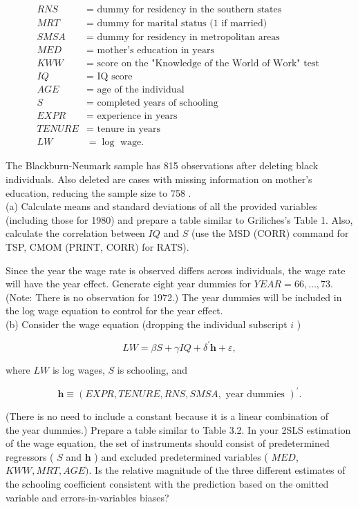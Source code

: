 \documentclass[10pt]{article}
\begin{document}
$$
\begin{aligned}
R N S & =\text { dummy for residency in the southern states } \\
M R T & =\text { dummy for marital status (1 if married) } \\
S M S A & =\text { dummy for residency in metropolitan areas } \\
M E D & =\text { mother's education in years } \\
K W W & =\text { score on the "Knowledge of the World of Work" test } \\
I Q & =\text { IQ score } \\
A G E & =\text { age of the individual } \\
S & =\text { completed years of schooling } \\
E X P R & =\text { experience in years } \\
T E N U R E & =\text { tenure in years } \\
L W & =\log \text { wage. }
\end{aligned}
$$

The Blackburn-Neumark sample has 815 observations after deleting black individuals. Also deleted are cases with missing information on mother's education, reducing the sample size to 758 .\\
(a) Calculate means and standard deviations of all the provided variables (including those for 1980) and prepare a table similar to Griliches's Table 1. Also, calculate the correlation between $I Q$ and $S$ (use the MSD (CORR) command for TSP, CMOM (PRINT, CORR) for RATS).

Since the year the wage rate is observed differs across individuals, the wage rate will have the year effect. Generate eight year dummies for $Y E A R=66, \ldots, 73$. (Note: There is no observation for 1972.) The year dummies will be included in the log wage equation to control for the year effect.\\
(b) Consider the wage equation (dropping the individual subscript $i$ )

$$
L W=\beta S+\gamma I Q+\delta^{\prime} \mathbf{h}+\varepsilon,
$$

where $L W$ is log wages, $S$ is schooling, and

$$
\mathbf{h} \equiv(E X P R, T E N U R E, R N S, S M S A, \text { year dummies })^{\prime} .
$$

(There is no need to include a constant because it is a linear combination of\\
the year dummies.) Prepare a table similar to Table 3.2. In your 2SLS estimation of the wage equation, the set of instruments should consist of predetermined regressors ( $S$ and $\mathbf{h}$ ) and excluded predetermined variables ( $M E D$, $K W W, M R T, A G E)$. Is the relative magnitude of the three different estimates of the schooling coefficient consistent with the prediction based on the omitted variable and errors-in-variables biases?
\end{document}
